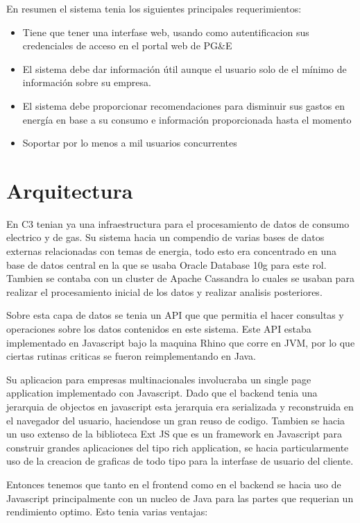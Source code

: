 \documentclass{article}
\begin{document}
En resumen el sistema tenia los siguientes principales requerimientos:
\begin{itemize}
\item Tiene que tener una interfase web, usando como autentificacion
  sus credenciales de acceso en el portal web de PG\&E
\item El sistema debe dar información útil aunque el usuario solo de
  el mínimo de información sobre su empresa.
\item El sistema debe proporcionar recomendaciones para disminuir sus
  gastos en energía en base a su consumo e información proporcionada
  hasta el momento
\item Soportar por lo menos a mil usuarios concurrentes
\end{itemize}
\section{Arquitectura}
En C3 tenian ya una infraestructura para el procesamiento de datos de
consumo electrico y de gas. Su sistema hacia un compendio de varias
bases de datos externas relacionadas con temas de energia, todo esto era
concentrado en una base de datos central en la que se usaba Oracle
Database 10g para este rol. Tambien se contaba con un cluster de
Apache Cassandra lo cuales se usaban para realizar el procesamiento
inicial de los datos y realizar analisis posteriores.

Sobre esta capa de datos se tenia un API que que permitia el
hacer consultas y operaciones sobre los datos contenidos en este
sistema. Este API estaba implementado en Javascript bajo la maquina
Rhino que corre en JVM, por lo que ciertas rutinas criticas se
fueron reimplementando en Java.

Su aplicacion para empresas multinacionales involucraba un single page
application implementado con Javascript. Dado que el backend tenia
una jerarquia de objectos en javascript esta jerarquia era serializada
y reconstruida en el navegador del usuario, haciendose un gran reuso
de codigo. Tambien se hacia un uso extenso de la biblioteca Ext JS
que es un framework en Javascript para construir grandes aplicaciones
del tipo rich application, se hacia particularmente uso de la creacion
de graficas de todo tipo para la interfase de usuario del cliente.

Entonces tenemos que tanto en el frontend como en el backend se hacia
uso de Javascript principalmente con un nucleo de Java para las partes
que requerian un rendimiento optimo. Esto tenia varias ventajas:
\end{document}
